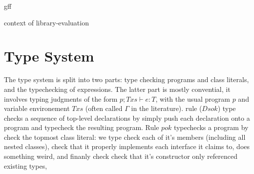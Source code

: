 gff
\begin{defye}%
\end{defye}



\begin{bnf}
  {context of library-evaluation}\\           {}%
\end{bnf}



\section{Type System}

The type system is split into two parts: type checking programs and class literals, and the typechecking of expressions. The latter part is mostly convential, it involves typing judgments of the form $p; Txs \vdash e : T$, with the usual program $p$ and variable environement $Txs$ (often called $\Gamma$ in the literature). rule ($Ds ok$) type checks a sequence of top-level declarations by simply push each declaration onto a program and typecheck the resulting program.
Rule $p ok$ typechecks a program by check the topmost class literal: we type check each of it’s members (including all nested classes), check that it properly implements each interface it claims to, does something weird, and finanly check check that it’s constructor only referenced existing types,

